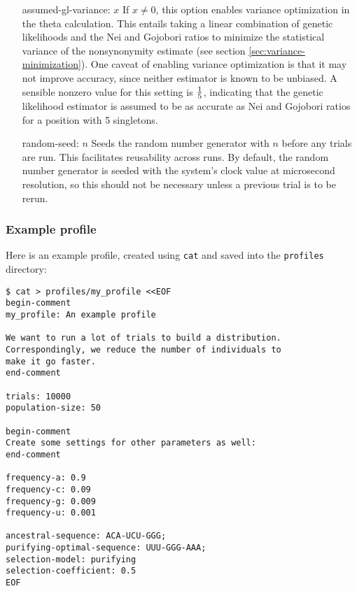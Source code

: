 \documentclass{article}
\begin{document}
        \begin{enumerate}
          \item[assumed-gl-variance: $x$]
	  If $x \neq 0$, this option enables variance optimization in the theta
	  calculation. This entails taking a linear combination of genetic
	  likelihoods and the Nei and Gojobori ratios to minimize the
	  statistical variance of the nonsynonymity estimate (see section
	      \ref{sec:variance-minimization}). One caveat of enabling variance
	  optimization is that it may not improve accuracy, since neither
	  estimator is known to be unbiased. A sensible nonzero value for this
	  setting is $1 \over 5$, indicating that the genetic likelihood
	  estimator is assumed to be as accurate as Nei and Gojobori ratios for
	  a position with 5 singletons.

          \item[random-seed: $n$]
          Seeds the random number generator with $n$ before any trials are run.
          This facilitates reusability across runs. By default, the random
          number generator is seeded with the system's clock value at
          microsecond resolution, so this should not be necessary unless a
          previous trial is to be rerun.
        \end{enumerate}

      \subsubsection{Example profile}
        \label{sec:example-profile}

        Here is an example profile, created using \verb|cat| and saved into the
        \verb|profiles| directory:

        \begin{verbatim}
$ cat > profiles/my_profile <<EOF
begin-comment
my_profile: An example profile

We want to run a lot of trials to build a distribution.
Correspondingly, we reduce the number of individuals to
make it go faster.
end-comment

trials: 10000
population-size: 50

begin-comment
Create some settings for other parameters as well:
end-comment

frequency-a: 0.9
frequency-c: 0.09
frequency-g: 0.009
frequency-u: 0.001

ancestral-sequence: ACA-UCU-GGG;
purifying-optimal-sequence: UUU-GGG-AAA;
selection-model: purifying
selection-coefficient: 0.5
EOF
        \end{verbatim}
\end{document}
